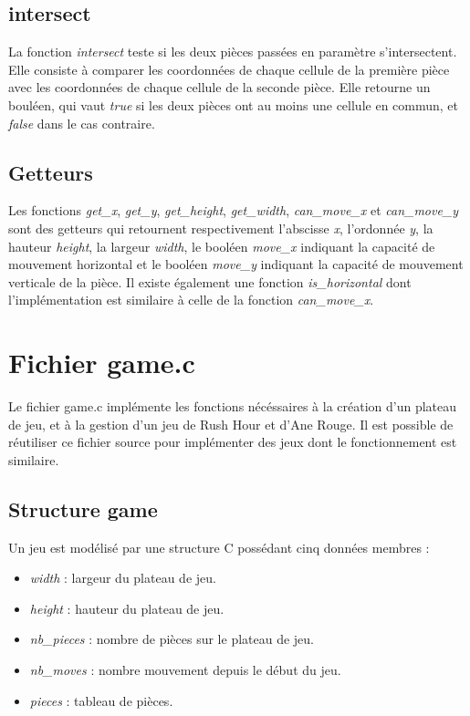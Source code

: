 \documentclass{report}
\begin{document}
\subsection{intersect}
La fonction \emph{intersect} teste si les deux pièces passées en paramètre s'intersectent. Elle consiste à comparer les coordonnées de chaque cellule de la première pièce avec les coordonnées de chaque cellule de la seconde pièce. Elle retourne un bouléen, qui vaut \emph{true} si les deux pièces ont au moins une cellule en commun, et \emph{false} dans le cas contraire.
\subsection{Getteurs}
Les fonctions \emph{get\_x}, \emph{get\_y}, \emph{get\_height}, \emph{get\_width}, \emph{can\_move\_x} et \emph{can\_move\_y} sont des getteurs qui retournent respectivement l'abscisse \emph{x}, l'ordonnée \emph{y}, la hauteur \emph{height}, la largeur \emph{width}, le booléen \emph{move\_x} indiquant la capacité de mouvement horizontal et le booléen \emph{move\_y} indiquant la capacité de mouvement verticale de la pièce. Il existe également une fonction \emph{is\_horizontal} dont l'implémentation est similaire à celle de la fonction \emph{can\_move\_x}.
\section{Fichier game.c}
Le fichier game.c implémente les fonctions nécéssaires à la création d'un plateau de jeu, et à la gestion d'un jeu de Rush Hour et d'Ane Rouge. Il est possible de réutiliser ce fichier source pour implémenter des jeux dont le fonctionnement est similaire.
\subsection{Structure game}
Un jeu est modélisé par une structure C possédant cinq données membres :
\begin{itemize}
\item \emph{width} : largeur du plateau de jeu.
\item \emph{height} : hauteur du plateau de jeu.
\item \emph{nb\_pieces} : nombre de pièces sur le plateau de jeu.
\item \emph{nb\_moves} : nombre mouvement depuis le début du jeu.
\item \emph{pieces} : tableau de pièces.
\end{itemize}
\end{document}
